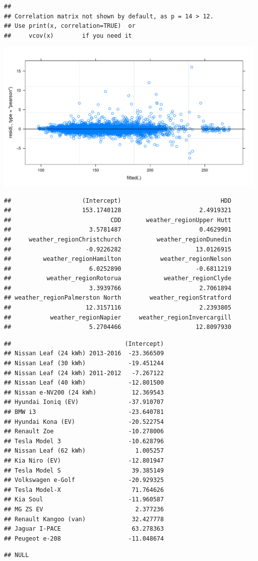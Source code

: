\documentclass[
]{article}
\begin{document}
\begin{verbatim}
## 
## Correlation matrix not shown by default, as p = 14 > 12.
## Use print(x, correlation=TRUE)  or
##     vcov(x)        if you need it
\end{verbatim}

\includegraphics{mixed_model_files/figure-latex/unnamed-chunk-6-1.pdf}

\begin{verbatim}
##                    (Intercept)                            HDD 
##                    153.1740128                      2.4919321 
##                            CDD       weather_regionUpper Hutt 
##                      3.5781487                      0.4629901 
##     weather_regionChristchurch          weather_regionDunedin 
##                     -0.9226282                     13.0126915 
##         weather_regionHamilton           weather_regionNelson 
##                      6.0252890                     -0.6811219 
##          weather_regionRotorua            weather_regionClyde 
##                      3.3939766                      2.7061894 
## weather_regionPalmerston North        weather_regionStratford 
##                     12.3157116                      2.2393805 
##           weather_regionNapier     weather_regionInvercargill 
##                      5.2704466                     12.8097930
\end{verbatim}

\begin{verbatim}
##                                (Intercept)
## Nissan Leaf (24 kWh) 2013-2016  -23.366509
## Nissan Leaf (30 kWh)            -19.451244
## Nissan Leaf (24 kWh) 2011-2012   -7.267122
## Nissan Leaf (40 kWh)            -12.801500
## Nissan e-NV200 (24 kWh)          12.369543
## Hyundai Ioniq (EV)              -37.910707
## BMW i3                          -23.640781
## Hyundai Kona (EV)               -20.522754
## Renault Zoe                     -10.278006
## Tesla Model 3                   -10.628796
## Nissan Leaf (62 kWh)              1.005257
## Kia Niro (EV)                   -12.801947
## Tesla Model S                    39.385149
## Volkswagen e-Golf               -20.929325
## Tesla Model-X                    71.764626
## Kia Soul                        -11.960587
## MG ZS EV                          2.377236
## Renault Kangoo (van)             32.427778
## Jaguar I-PACE                    63.278363
## Peugeot e-208                   -11.048674
\end{verbatim}

\begin{verbatim}
## NULL
\end{verbatim}
\end{document}

